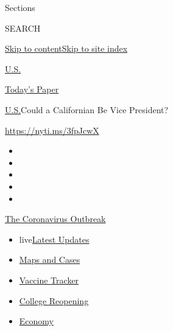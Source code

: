 Sections

SEARCH

\protect\hyperlink{site-content}{Skip to
content}\protect\hyperlink{site-index}{Skip to site index}

\href{https://www.nytimes.com/section/us}{U.S.}

\href{https://myaccount.nytimes.com/auth/login?response_type=cookie\&client_id=vi}{}

\href{https://www.nytimes.com/section/todayspaper}{Today's Paper}

\href{/section/us}{U.S.}\textbar{}Could a Californian Be Vice President?

\url{https://nyti.ms/3fpJcwX}

\begin{itemize}
\item
\item
\item
\item
\item
\end{itemize}

\href{https://www.nytimes.com/news-event/coronavirus?action=click\&pgtype=Article\&state=default\&region=TOP_BANNER\&context=storylines_menu}{The
Coronavirus Outbreak}

\begin{itemize}
\tightlist
\item
  live\href{https://www.nytimes.com/2020/08/04/world/coronavirus-cases.html?action=click\&pgtype=Article\&state=default\&region=TOP_BANNER\&context=storylines_menu}{Latest
  Updates}
\item
  \href{https://www.nytimes.com/interactive/2020/us/coronavirus-us-cases.html?action=click\&pgtype=Article\&state=default\&region=TOP_BANNER\&context=storylines_menu}{Maps
  and Cases}
\item
  \href{https://www.nytimes.com/interactive/2020/science/coronavirus-vaccine-tracker.html?action=click\&pgtype=Article\&state=default\&region=TOP_BANNER\&context=storylines_menu}{Vaccine
  Tracker}
\item
  \href{https://www.nytimes.com/2020/08/02/us/covid-college-reopening.html?action=click\&pgtype=Article\&state=default\&region=TOP_BANNER\&context=storylines_menu}{College
  Reopening}
\item
  \href{https://www.nytimes.com/live/2020/08/04/business/stock-market-today-coronavirus?action=click\&pgtype=Article\&state=default\&region=TOP_BANNER\&context=storylines_menu}{Economy}
\end{itemize}


